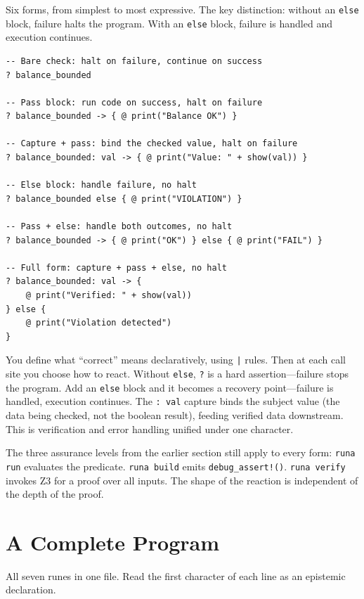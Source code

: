 \documentclass[11pt,a4paper]{article}
\begin{document}
Six forms, from simplest to most expressive. The key distinction: without an \texttt{else} block, failure halts the program. With an \texttt{else} block, failure is handled and execution continues.

\begin{lstlisting}
-- Bare check: halt on failure, continue on success
? balance_bounded

-- Pass block: run code on success, halt on failure
? balance_bounded -> { @ print("Balance OK") }

-- Capture + pass: bind the checked value, halt on failure
? balance_bounded: val -> { @ print("Value: " + show(val)) }

-- Else block: handle failure, no halt
? balance_bounded else { @ print("VIOLATION") }

-- Pass + else: handle both outcomes, no halt
? balance_bounded -> { @ print("OK") } else { @ print("FAIL") }

-- Full form: capture + pass + else, no halt
? balance_bounded: val -> {
    @ print("Verified: " + show(val))
} else {
    @ print("Violation detected")
}
\end{lstlisting}

You define what ``correct'' means declaratively, using \texttt{|} rules. Then at each call site you choose how to react. Without \texttt{else}, \texttt{?} is a hard assertion---failure stops the program. Add an \texttt{else} block and it becomes a recovery point---failure is handled, execution continues. The \texttt{: val} capture binds the subject value (the data being checked, not the boolean result), feeding verified data downstream. This is verification and error handling unified under one character.

The three assurance levels from the earlier section still apply to every form: \texttt{runa run} evaluates the predicate. \texttt{runa build} emits \texttt{debug\_assert!()}. \texttt{runa verify} invokes Z3 for a proof over all inputs. The shape of the reaction is independent of the depth of the proof.

\section{A Complete Program}

All seven runes in one file. Read the first character of each line as an epistemic declaration.
\end{document}

